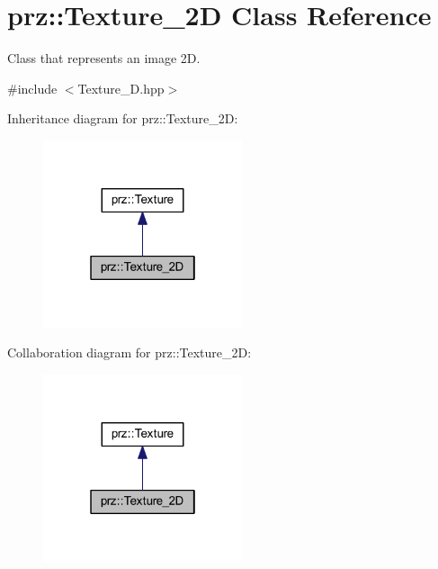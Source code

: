\hypertarget{classprz_1_1_texture__2_d}{}\section{prz\+::Texture\+\_\+2D Class Reference}
\label{classprz_1_1_texture__2_d}


Class that represents an image 2D.  




{\ttfamily \#include $<$Texture\+\_\+D.\+hpp$>$}



Inheritance diagram for prz\+::Texture\+\_\+2D\+:
\nopagebreak
\begin{figure}[H]
\begin{center}
\leavevmode
\includegraphics[width=166pt]{classprz_1_1_texture__2_d__inherit__graph}
\end{center}
\end{figure}


Collaboration diagram for prz\+::Texture\+\_\+2D\+:
\nopagebreak
\begin{figure}[H]
\begin{center}
\leavevmode
\includegraphics[width=166pt]{classprz_1_1_texture__2_d__coll__graph}
\end{center}
\end{figure}
